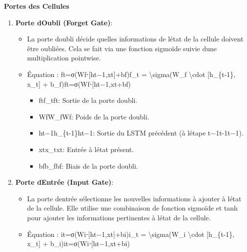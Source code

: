 \documentclass[
]{article}
\begin{document}
\textbf{Portes des Cellules}

\begin{enumerate}
\def\labelenumi{\arabic{enumi}.}
\item
  \textbf{Porte d\textquotesingle Oubli (Forget Gate)}:

  \begin{itemize}
  \item
    La porte d\textquotesingle oubli décide quelles informations de
    l\textquotesingle état de la cellule doivent être oubliées. Cela se
    fait via une fonction sigmoïde suivie d\textquotesingle une
    multiplication pointwise.
  \item
    Équation : ft=σ(Wf⋅{[}ht−1,xt{]}+bf)f\_t = \textbackslash sigma(W\_f
    \textbackslash cdot {[}h\_\{t-1\}, x\_t{]} +
    b\_f)ft\hspace{0pt}=σ(Wf\hspace{0pt}⋅{[}ht−1\hspace{0pt},xt\hspace{0pt}{]}+bf\hspace{0pt})

    \begin{itemize}
    \item
      ftf\_tft\hspace{0pt}: Sortie de la porte d\textquotesingle oubli.
    \item
      WfW\_fWf\hspace{0pt}: Poids de la porte d\textquotesingle oubli.
    \item
      ht−1h\_\{t-1\}ht−1\hspace{0pt}: Sortie du LSTM précédent (à
      l\textquotesingle étape t−1t-1t−1).
    \item
      xtx\_txt\hspace{0pt}: Entrée à l\textquotesingle état présent.
    \item
      bfb\_fbf\hspace{0pt}: Biais de la porte d\textquotesingle oubli.
    \end{itemize}
  \end{itemize}
\item
  \textbf{Porte d\textquotesingle Entrée (Input Gate)}:

  \begin{itemize}
  \item
    La porte d\textquotesingle entrée sélectionne les nouvelles
    informations à ajouter à l\textquotesingle état de la cellule. Elle
    utilise une combinaison de fonction sigmoïde et tanh pour ajouter
    les informations pertinentes à l\textquotesingle état de la cellule.
  \item
    Équation : it=σ(Wi⋅{[}ht−1,xt{]}+bi)i\_t = \textbackslash sigma(W\_i
    \textbackslash cdot {[}h\_\{t-1\}, x\_t{]} +
    b\_i)it\hspace{0pt}=σ(Wi\hspace{0pt}⋅{[}ht−1\hspace{0pt},xt\hspace{0pt}{]}+bi\hspace{0pt})


\end{itemize}
\end{enumerate}
\end{document}
